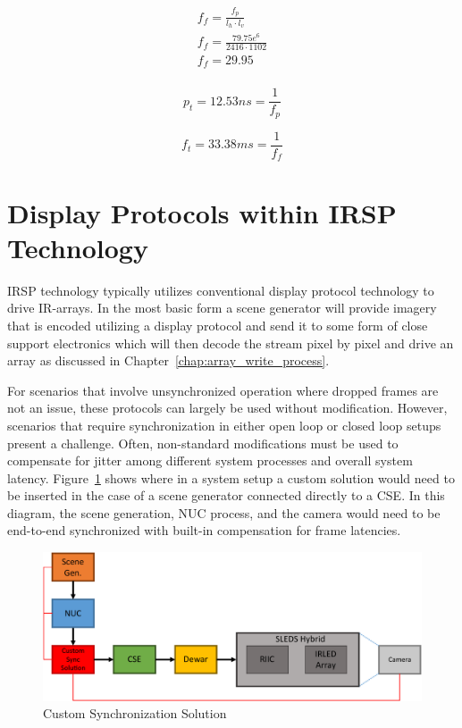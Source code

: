     \begin{equation}
        \begin{array}{ l }
            \displaystyle f_f={\frac{f_p}{l_h \cdot l_v}} \\[11pt]
            \displaystyle f_f={\frac{79.75e^6}{2416 \cdot 1102}} \\[11pt]
            \displaystyle f_f={29.95} \\[11pt]
        \end{array}
        \label{eq:f_f_solve}
    \end{equation}

    \begin{equation}
        p_t=12.53ns={\frac{1}{f_p}}
        \label{eq:p_t_solve}
    \end{equation}

    \begin{equation}
        f_t=33.38ms={\frac{1}{f_f}}
        \label{eq:f_t_solve}
    \end{equation}

\section{Display Protocols within IRSP Technology}
    \label{sec:displays_within_proj_system}
    IRSP technology typically utilizes conventional display protocol technology to drive IR-arrays. In the most basic form a scene generator will provide imagery that is encoded utilizing a display protocol and send it to some form of close support electronics which will then decode the stream pixel by pixel and drive an array as discussed in Chapter~\ref{chap:array_write_process}.

    For scenarios that involve unsynchronized operation where dropped frames are not an issue, these protocols can largely be used without modification. However, scenarios that require synchronization in either open loop or closed loop setups present a challenge. Often, non-standard modifications must be used to compensate for jitter among different system processes and overall system latency. Figure~\ref{fig:custom_sync} shows where in a system setup a custom solution would need to be inserted in the case of a scene generator connected directly to a CSE. In this diagram, the scene generation, NUC process, and the camera would need to be end-to-end synchronized with built-in compensation for frame latencies.

    \begin{figure}
        \centering
        \includegraphics[width=1.0\textwidth]{fig/custom_sync.pdf}
        \caption{Custom Synchronization Solution}
        \label{fig:custom_sync}
    \end{figure}

